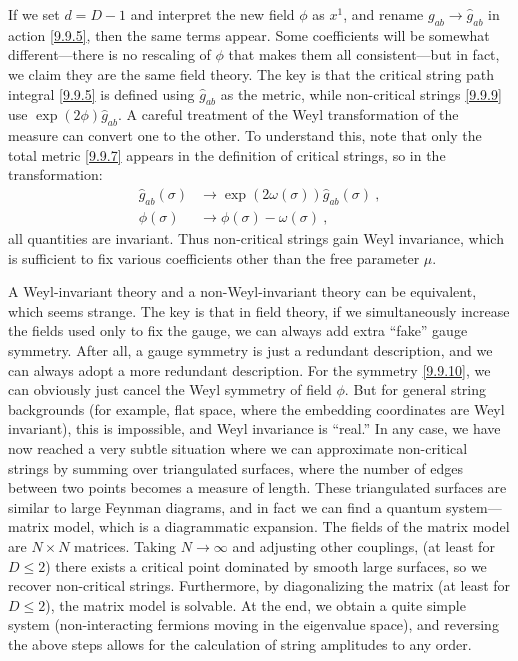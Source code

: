 If we set $d=D-1$ and interpret the new field $\phi$ as $x^{1}$, and rename $g_{a b} \to \hat{g}_{a b}$ in action \eqref{9.9.5}, then the same terms appear. 
Some coefficients will be somewhat different—there is no rescaling of $\phi$ that makes them all consistent—but in fact, we claim they are the same field theory.
The key is that the critical string path integral \eqref{9.9.5} is defined using $\hat{g}_{ab}$ as the metric, while non-critical strings \eqref{9.9.9} use $\exp (2 \phi) \hat{g}_{a b}$. 
A careful treatment of the Weyl transformation of the measure can convert one to the other.
To understand this, note that only the total metric \eqref{9.9.7} appears in the definition of critical strings, so in the transformation:
\begin{subequations} \label{9.9.10}
	\begin{align}
		\hat{g}_{a b}(\sigma)  &\rightarrow \exp (2 \omega(\sigma)) \hat{g}_{a b}(\sigma) \:,  \label{9.9.10a}\\
		\phi(\sigma) &\rightarrow \phi(\sigma)-\omega(\sigma) \:, \label{9.9.10b}
	\end{align}
\end{subequations}
all quantities are invariant.
Thus non-critical strings gain Weyl invariance, which is sufficient to fix various coefficients other than the free parameter $\mu$.

A Weyl-invariant theory and a non-Weyl-invariant theory can be equivalent, which seems strange. The key is that in field theory, if we simultaneously increase the fields used only to fix the gauge, we can always add extra ``fake'' gauge symmetry. 
After all, a gauge symmetry is just a redundant description, and we can always adopt a more redundant description. For the symmetry \eqref{9.9.10}, we can obviously just cancel the Weyl symmetry of field $\phi$. 
But for general string backgrounds (for example, flat space, where the embedding coordinates are Weyl invariant), this is impossible, and Weyl invariance is ``real.''
In any case, we have now reached a very subtle situation where we can approximate non-critical strings by summing over triangulated surfaces, where the number of edges between two points becomes a measure of length. 
These triangulated surfaces are similar to large Feynman diagrams, and in fact we can find a quantum system—matrix model, which is a diagrammatic expansion. 
The fields of the matrix model are $N \times N$ matrices. Taking $N \rightarrow \infty$ and adjusting other couplings, (at least for $D \leq 2$) there exists a critical point dominated by smooth large surfaces, 
so we recover non-critical strings.
Furthermore, by diagonalizing the matrix (at least for $D \leq 2$), the matrix model is solvable. 
At the end, we obtain a quite simple system (non-interacting fermions moving in the eigenvalue space), and reversing the above steps allows for the calculation of string amplitudes to any order.

